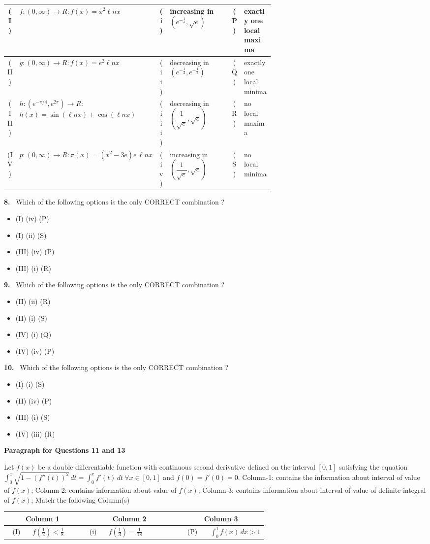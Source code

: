 \documentclass[10pt]{extarticle}
\newcommand{\qn}[1]{\par\smallskip\noindent\textbf{#1.}~}
\newcommand{\paraq}[2]{\par\smallskip\noindent\textbf{Paragraph for Questions #1 and #2}\par}
\newenvironment{qoptions}{\begin{itemize}[leftmargin=1.8em,itemsep=1pt,topsep=2pt,label={}]}{\end{itemize}}
\newcommand{\opt}[2]{\item[(#1)] #2}
\begin{document}
\begin{multicols}{2}
{\begin{tabular}{|c|p{0.27\linewidth}|c|p{0.24\linewidth}|c|p{0.12\linewidth}|}
(I) & $f:(0,\infty)\to R:f(x)=x^2\ell nx$ & (i) & increasing in $\left(e^{-\frac13},\sqrt e\right)$ & (P) & exactly one local maxima\\ \hline
(II) & $g:(0,\infty)\to R:f(x)=e^2\ell nx$ & (ii) & decreasing in $\left(e^{-\frac12},e^{-\frac13}\right)$ & (Q) & exactly one local minima\\ \hline
(III) & $h:(e^{-\pi/4},e^{2\pi})\to R$: $h(x)=\sin(\ell nx)+\cos(\ell nx)$ & (iii) & decreasing in $\left(\dfrac1{\sqrt e},\sqrt e\right)$ & (R) & no local maxima\\ \hline
(IV) & $p:(0,\infty)\to R:\pi(x)=(x^2-3e)e\,\ell nx$ & (iv) & increasing in $\left(\dfrac1{\sqrt e},\sqrt e\right)$ & (S) & no local minima\\ \hline
\end{tabular}}\par
\qn{8} Which of the following options is the only CORRECT combination ?
\begin{qoptions}
\opt{A}{(I) (iv) (P)}
\opt{B}{(I) (ii) (S)}
\opt{C}{(III) (iv) (P)}
\opt{D}{(III) (i) (R)}
\end{qoptions}
\qn{9} Which of the following options is the only CORRECT combination ?
\begin{qoptions}
\opt{A}{(II) (ii) (R)}
\opt{B}{(II) (i) (S)}
\opt{C}{(IV) (i) (Q)}
\opt{D}{(IV) (iv) (P)}
\end{qoptions}
\qn{10} Which of the following options is the only CORRECT combination ?
\begin{qoptions}
\opt{A}{(I) (i) (S)}
\opt{B}{(II) (iv) (P)}
\opt{C}{(III) (i) (S)}
\opt{D}{(IV) (iii) (R)}
\end{qoptions}
\paraq{11}{13}
Let $f(x)$ be a double differentiable function with continuous second derivative defined on the interval $[0,1]$ satisfying the equation $\displaystyle\int_0^x\sqrt{1-(f''(t))^2}\,dt=\int_0^xf'(t)\,dt\ \forall x\in[0,1]$ and $f(0)=f'(0)=0$. Column-1: contains the information about interval of value of $f(x)$; Column-2: contains information about value of $f(x)$; Column-3: contains information about interval of value of definite integral of $f(x)$; Match the following Column(s)\par
{\footnotesize\setlength{\tabcolsep}{2pt}\begin{tabular}{|c|p{0.2\linewidth}|c|p{0.28\linewidth}|c|p{0.22\linewidth}|}
\hline
\multicolumn{2}{|c|}{\textbf{Column 1}} & \multicolumn{2}{c|}{\textbf{Column 2}} & \multicolumn{2}{c|}{\textbf{Column 3}}\\ \hline
(I) & $f\!\left(\frac12\right)<\frac18$ & (i) & $f\!\left(\frac13\right)=\frac1{18}$ & (P) & $\displaystyle\int_0^1f(x)\,dx>1$\\ \hline

\end{tabular}}
\end{multicols}
\end{document}
